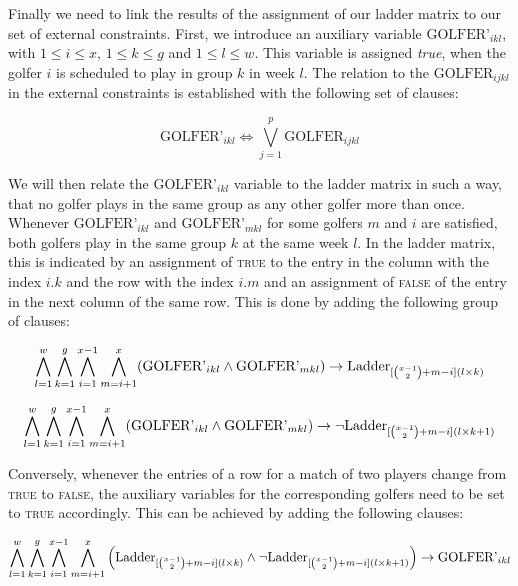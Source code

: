 \documentclass[a4paper]{scrartcl}
\begin{document}
Finally we need to link the results of the assignment of our ladder matrix to our set of external constraints. First, we introduce an auxiliary variable $\text{GOLFER'}_{ikl}$, with $1 \leq i \leq x$, $1 \leq k \leq g$ and $1 \leq l \leq w$. This variable is assigned \emph{true}, when the golfer $i$ is scheduled to play in group $k$ in week $l$. The relation to the $\text{GOLFER}_{ijkl}$ in the external constraints is established with the following set of clauses:

\begin{equation}
    \text{GOLFER'}_{ikl} \iff \bigvee \limits_{j=1}^p \text{GOLFER}_{ijkl}
\end{equation}

We will then relate the $\text{GOLFER'}_{ikl}$ variable to the ladder matrix in such a way, that no golfer plays in the same group as any other golfer more than once. Whenever $\text{GOLFER'}_{ikl}$ and $\text{GOLFER'}_{mkl}$ for some golfers $m$ and $i$ are satisfied, both golfers play in the same group $k$ at the same week $l$. In the ladder matrix, this is indicated by an assignment of \textsc{true} to the entry in the column with the index $i.k$ and the row with the index $i.m$ and an assignment of \textsc{false} of the entry in the next column of the same row. This is done by adding the following group of clauses:

\begin{equation}
\centering
    \bigwedge \limits_{l=1}^{w}
    \bigwedge \limits_{k=1}^{g}
    \bigwedge \limits_{i=1}^{x-1}
    \bigwedge \limits_{m=i+1}^{x}
    (\text{GOLFER'}_{ikl} \wedge \text{GOLFER'}_{mkl}) \to \text{Ladder}_{[{x-1 \choose 2}+m-i](l \times k)}
\end{equation}

\begin{equation}
\centering
    \bigwedge \limits_{l=1}^{w}
    \bigwedge \limits_{k=1}^{g}
    \bigwedge \limits_{i=1}^{x-1}
    \bigwedge \limits_{m=i+1}^{x}
    (\text{GOLFER'}_{ikl} \wedge \text{GOLFER'}_{mkl}) \to \neg \text{Ladder}_{[{x-1 \choose 2}+m-i](l \times k + 1)}
\end{equation}

Conversely, whenever the entries of a row for a match of two players change from \textsc{true} to \textsc{false}, the auxiliary  variables for the corresponding golfers need to be set to \textsc{true} accordingly. This can be achieved by adding the following clauses:

\begin{equation}
\centering
    \bigwedge \limits_{l=1}^{w}
    \bigwedge \limits_{k=1}^{g}
    \bigwedge \limits_{i=1}^{x-1}
    \bigwedge \limits_{m=i+1}^{x}
    \Big(
        \text{Ladder}_{
            [
                {x-1 \choose 2}
                +m-i
            ](l \times k)
        }
        \wedge
        \neg
        \text{Ladder}_{
            [
                {x-1 \choose 2}
                +m-i
            ](l \times k + 1)
        }
    \Big)
    \to
    \text{GOLFER'}_{ikl}
\end{equation}
\end{document}
